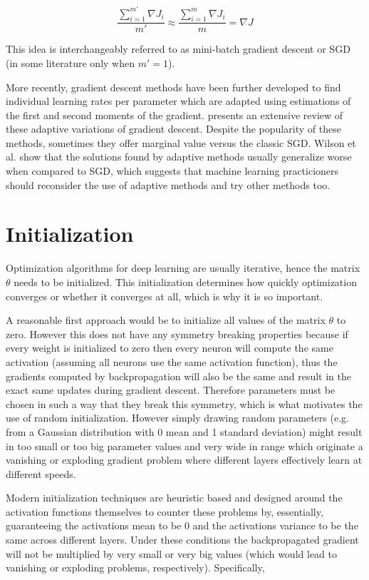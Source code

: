 $$
\frac{\sum_{i=1}^{m'} \nabla J_i}{m'} \approx \frac{\sum_{i=1}^m \nabla J_{i}}{m} = \nabla J
$$

This idea is interchangeably referred to as mini-batch gradient descent or \ac{SGD} (in some literature only when $m' = 1$).

More recently, gradient descent methods have been further developed to find individual learning rates per parameter which are adapted using estimations of the first and second moments of the gradient. \citeauthor{ruder2016} \cite{ruder2016} presents an extensive review of these adaptive variations of gradient descent. Despite the popularity of these methods, sometimes they offer marginal value versus the classic \ac{SGD}. Wilson et al. \cite{wilson2017} show that the solutions found by adaptive methods usually generalize worse when compared to \ac{SGD}, which suggests that machine learning practicioners should reconsider the use of adaptive methods and try other methods too.

\section{Initialization}

Optimization algorithms for deep learning are usually iterative, hence the matrix $\theta$ needs to be initialized. This initialization determines how quickly optimization converges or whether it converges at all, which is why it is so important.

A reasonable first approach would be to initialize all values of the matrix $\theta$ to zero. However this does not have any symmetry breaking properties because if every weight is initialized to zero then every neuron will compute the same activation (assuming all neurons use the same activation function), thus the gradients computed by backpropagation will also be the same and result in the exact same updates during gradient descent. Therefore parameters must be chosen in such a way that they break this symmetry, which is what motivates the use of random initialization. However simply drawing random parameters (e.g. from a Gaussian distribution with 0 mean and 1 standard deviation) might result in too small or too big parameter values and very wide in range which originate a vanishing or exploding gradient problem where different layers effectively learn at different speeds.

Modern initialization techniques are heuristic based and designed around the activation functions themselves to counter these problems by, essentially, guaranteeing the activations mean to be $0$ and the activations variance to be the same across different layers. Under these conditions the backpropagated gradient will not be multiplied by very small or very big values (which would lead to vanishing or exploding problems, respectively). Specifically,

